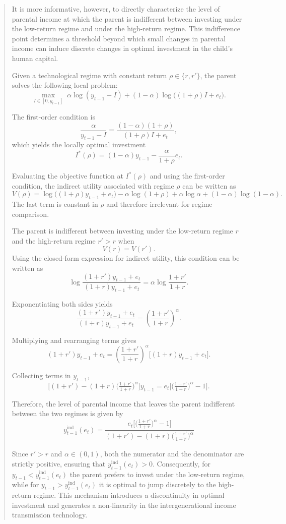 \documentclass[12pt]{article}
\begin{document}
\begin{abstract}
It is more informative, however, to directly characterize the level of parental income at which the parent is indifferent between investing under the low-return regime and under the high-return regime. This indifference point determines a threshold beyond which small changes in parental income can induce discrete changes in optimal investment in the child’s human capital.

Given a technological regime with constant return $\rho \in \{r,r'\}$, the parent solves the following local problem:
\[
\max_{I\in[0,y_{t-1}]}
\;
\alpha \log(y_{t-1}-I)
+
(1-\alpha)\log\big((1+\rho)I+e_t\big).
\]

The first-order condition is
\[
\frac{\alpha}{y_{t-1}-I}
=
\frac{(1-\alpha)(1+\rho)}{(1+\rho)I+e_t},
\]
which yields the locally optimal investment
\[
I^*(\rho)
=
(1-\alpha)y_{t-1}
-
\frac{\alpha}{1+\rho}e_t.
\]

Evaluating the objective function at $I^*(\rho)$ and using the first-order condition, the indirect utility associated with regime $\rho$ can be written as
\[
V(\rho)
=
\log\big((1+\rho)y_{t-1}+e_t\big)
-
\alpha\log(1+\rho)
+
\alpha\log\alpha
+
(1-\alpha)\log(1-\alpha).
\]
The last term is constant in $\rho$ and therefore irrelevant for regime comparison.

The parent is indifferent between investing under the low-return regime $r$ and the high-return regime $r'>r$ when
\[
V(r)=V(r').
\]
Using the closed-form expression for indirect utility, this condition can be written as
\[
\log\frac{(1+r')y_{t-1}+e_t}{(1+r)y_{t-1}+e_t}
=
\alpha
\log\frac{1+r'}{1+r}.
\tag{IC}
\]

Exponentiating both sides yields
\[
\frac{(1+r')y_{t-1}+e_t}{(1+r)y_{t-1}+e_t}
=
\left(\frac{1+r'}{1+r}\right)^{\alpha}.
\]

Multiplying and rearranging terms gives
\[
(1+r')y_{t-1}+e_t
=
\left(\frac{1+r'}{1+r}\right)^{\alpha}
\big[(1+r)y_{t-1}+e_t\big].
\]

Collecting terms in $y_{t-1}$,
\[
\Big[(1+r')-(1+r)\Big(\tfrac{1+r'}{1+r}\Big)^{\alpha}\Big]y_{t-1}
=
e_t\Big[\Big(\tfrac{1+r'}{1+r}\Big)^{\alpha}-1\Big].
\]

Therefore, the level of parental income that leaves the parent indifferent between the two regimes is given by
\[
\boxed{
y_{t-1}^{\text{ind}}(e_t)
=
\frac{
e_t\Big[\big(\tfrac{1+r'}{1+r}\big)^{\alpha}-1\Big]
}{
(1+r')-(1+r)\big(\tfrac{1+r'}{1+r}\big)^{\alpha}
}
}
\]

Since $r'>r$ and $\alpha\in(0,1)$, both the numerator and the denominator are strictly positive, ensuring that $y_{t-1}^{\text{ind}}(e_t)>0$. Consequently, for $y_{t-1}<y_{t-1}^{\text{ind}}(e_t)$ the parent prefers to invest under the low-return regime, while for $y_{t-1}>y_{t-1}^{\text{ind}}(e_t)$ it is optimal to jump discretely to the high-return regime. This mechanism introduces a discontinuity in optimal investment and generates a non-linearity in the intergenerational income transmission technology.


\end{abstract}
\end{document}
